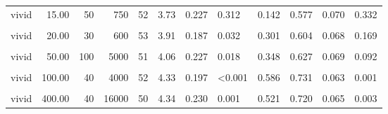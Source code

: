 \documentclass[
]{article}
\begin{document}
\begin{longtable}[t]{lrrrrrrlrrrl}
\hspace{1em}vivid & 15.00 & 50 & 750 & 52 & 3.73 & 0.227 & 0.312 & 0.142 & 0.577 & 0.070 & 0.332\\
\hspace{1em}\cellcolor{gray!10}{vivid} & \cellcolor{gray!10}{20.00} & \cellcolor{gray!10}{10} & \cellcolor{gray!10}{200} & \cellcolor{gray!10}{49} & \cellcolor{gray!10}{3.71} & \cellcolor{gray!10}{0.220} & \cellcolor{gray!10}{0.293} & \cellcolor{gray!10}{0.140} & \cellcolor{gray!10}{0.653} & \cellcolor{gray!10}{0.069} & \cellcolor{gray!10}{0.044}\\
\hspace{1em}vivid & 20.00 & 30 & 600 & 53 & 3.91 & 0.187 & 0.032 & 0.301 & 0.604 & 0.068 & 0.169\\
\hspace{1em}\cellcolor{gray!10}{vivid} & \cellcolor{gray!10}{50.00} & \cellcolor{gray!10}{10} & \cellcolor{gray!10}{500} & \cellcolor{gray!10}{50} & \cellcolor{gray!10}{3.86} & \cellcolor{gray!10}{0.227} & \cellcolor{gray!10}{0.095} & \cellcolor{gray!10}{0.226} & \cellcolor{gray!10}{0.680} & \cellcolor{gray!10}{0.067} & \cellcolor{gray!10}{0.015}\\
\hspace{1em}vivid & 50.00 & 100 & 5000 & 51 & 4.06 & 0.227 & 0.018 & 0.348 & 0.627 & 0.069 & 0.092\\
\hspace{1em}\cellcolor{gray!10}{vivid} & \cellcolor{gray!10}{100.00} & \cellcolor{gray!10}{30} & \cellcolor{gray!10}{3000} & \cellcolor{gray!10}{51} & \cellcolor{gray!10}{3.73} & \cellcolor{gray!10}{0.216} & \cellcolor{gray!10}{0.273} & \cellcolor{gray!10}{0.148} & \cellcolor{gray!10}{0.667} & \cellcolor{gray!10}{0.067} & \cellcolor{gray!10}{0.024}\\
\hspace{1em}vivid & 100.00 & 40 & 4000 & 52 & 4.33 & 0.197 & <0.001 & 0.586 & 0.731 & 0.063 & 0.001\\
\hspace{1em}\cellcolor{gray!10}{vivid} & \cellcolor{gray!10}{400.00} & \cellcolor{gray!10}{10} & \cellcolor{gray!10}{4000} & \cellcolor{gray!10}{52} & \cellcolor{gray!10}{4.77} & \cellcolor{gray!10}{0.189} & \cellcolor{gray!10}{<0.001} & \cellcolor{gray!10}{0.939} & \cellcolor{gray!10}{0.846} & \cellcolor{gray!10}{0.051} & \cellcolor{gray!10}{<0.001}\\
\hspace{1em}vivid & 400.00 & 40 & 16000 & 50 & 4.34 & 0.230 & 0.001 & 0.521 & 0.720 & 0.065 & 0.003\\

\end{longtable}
\end{document}
